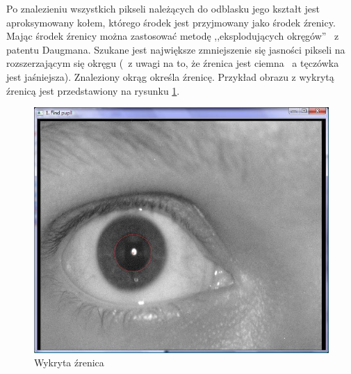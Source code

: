 Po znalezieniu wszystkich pikseli należących do odblasku jego kształt jest aproksymowany kołem, którego środek jest przyjmowany jako środek źrenicy. Mając środek źrenicy można zastosować metodę ,,eksplodujących okręgów'' ~z patentu Daugmana. Szukane jest największe zmniejszenie się jasności pikseli na rozszerzającym się okręgu (~z uwagi na to, że źrenica jest ciemna ~a tęczówka jest jaśniejsza). Znaleziony okrąg określa źrenicę. Przykład obrazu z wykrytą źrenicą jest przedstawiony na rysunku \ref{fig:zrenicaNasza}.
\begin{figure}
\begin{center}
\includegraphics[scale=0.5]{zrenica.jpg}
\caption{Wykryta źrenica}
\label{fig:zrenicaNasza}
\end{center}
\end{figure}

